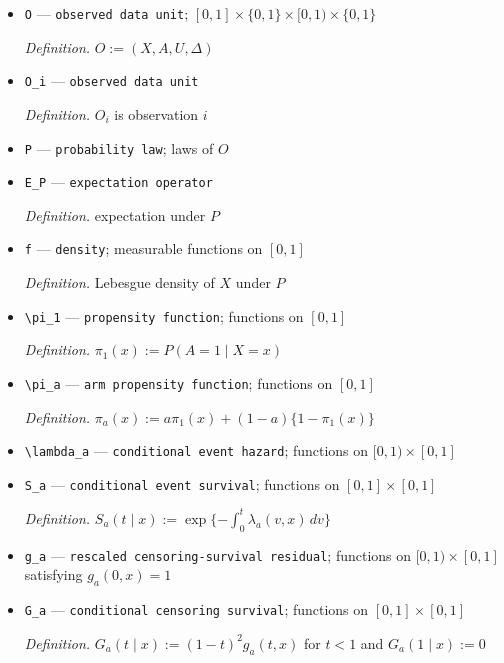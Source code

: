 \documentclass{article}
\begin{document}
\begin{itemize}
  \par\smallskip\noindent\emph{Definition.} \(\Delta:=\mathbf 1\{T\le C\}\)
  \item \texttt{O} --- \texttt{observed data unit}; \([0,1]\times\{0,1\}\times[0,1)\times\{0,1\}\)
  \par\smallskip\noindent\emph{Definition.} \(O:=(X,A,U,\Delta)\)
  \item \texttt{O\_\allowbreak{}i} --- \texttt{observed data unit}
  \par\smallskip\noindent\emph{Definition.} \(O_i\) is observation \(i\)
  \item \texttt{P} --- \texttt{probability law}; laws of \(O\)
  \item \texttt{E\_\allowbreak{}P} --- \texttt{expectation operator}
  \par\smallskip\noindent\emph{Definition.} expectation under \(P\)
  \item \texttt{f} --- \texttt{density}; measurable functions on \([0,1]\)
  \par\smallskip\noindent\emph{Definition.} Lebesgue density of \(X\) under \(P\)
  \item \texttt{\textbackslash{}\allowbreak{}pi\_\allowbreak{}1} --- \texttt{propensity function}; functions on \([0,1]\)
  \par\smallskip\noindent\emph{Definition.} \(\pi_1(x):=P(A=1\mid X=x)\)
  \item \texttt{\textbackslash{}\allowbreak{}pi\_\allowbreak{}a} --- \texttt{arm propensity function}; functions on \([0,1]\)
  \par\smallskip\noindent\emph{Definition.} \(\pi_a(x):=a\pi_1(x)+(1-a)\{1-\pi_1(x)\}\)
  \item \texttt{\textbackslash{}\allowbreak{}lambda\_\allowbreak{}a} --- \texttt{conditional event hazard}; functions on \([0,1)\times[0,1]\)
  \item \texttt{S\_\allowbreak{}a} --- \texttt{conditional event survival}; functions on \([0,1]\times[0,1]\)
  \par\smallskip\noindent\emph{Definition.} \(S_a(t\mid x):=\exp\{-\int_0^t\lambda_a(v,x)\,dv\}\)
  \item \texttt{g\_\allowbreak{}a} --- \texttt{rescaled censoring-\allowbreak{}survival residual}; functions on \([0,1)\times[0,1]\) satisfying \(g_a(0,x)=1\)
  \item \texttt{G\_\allowbreak{}a} --- \texttt{conditional censoring survival}; functions on \([0,1]\times[0,1]\)
  \par\smallskip\noindent\emph{Definition.} \(G_a(t\mid x):=(1-t)^2g_a(t,x)\) for \(t<1\) and \(G_a(1\mid x):=0\)

\end{itemize}
\end{document}
